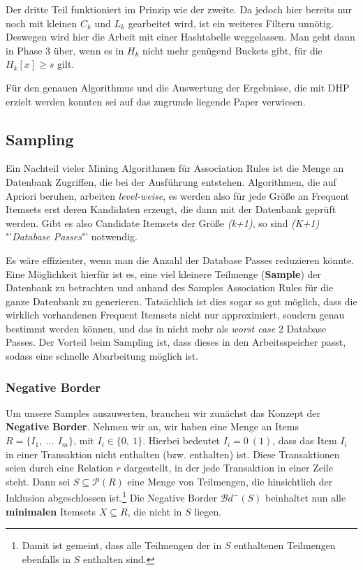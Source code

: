 Der dritte Teil funktioniert im Prinzip wie der zweite. Da jedoch hier bereits
nur noch mit kleinen \(C_k\) und \(L_k\) gearbeitet wird, ist ein weiteres Filtern
unnötig. Deswegen wird hier die Arbeit mit einer Hashtabelle weggelassen. Man geht
dann in Phase 3 über, wenn es in \(H_k\) nicht mehr genügend Buckets gibt, für die
\(H_k[x] \geq s\) gilt.

Für den genauen Algorithmus und die Auswertung der Ergebnisse, die mit DHP erzielt
werden konnten sei auf das zugrunde liegende Paper verwiesen.

\subsection{Sampling}
Ein Nachteil vieler Mining Algorithmen für Association Rules ist die Menge an
Datenbank Zugriffen, die bei der Ausführung entstehen. Algorithmen, die auf 
Apriori beruhen, arbeiten \textit{level-weise}, es werden also für jede Größe
an Frequent Itemsets erst deren Kandidaten erzeugt, die dann mit der Datenbank
geprüft werden. Gibt es also Candidate Itemsets der Größe \textit{(k+1)}, so 
sind \textit{(K+1)} "'\textit{Database Passes}"' notwendig.

Es wäre effizienter, wenn man die Anzahl der Database Passes reduzieren könnte.
Eine Möglichkeit hierfür ist es, eine viel kleinere Teilmenge (\textbf{Sample})
der Datenbank zu betrachten und anhand des Samples Association Rules für die
ganze Datenbank zu generieren. Tatsächlich ist dies sogar so gut möglich, dass
die wirklich vorhandenen Frequent Itemsets nicht nur approximiert, sondern genau
bestimmt werden können, und das in nicht mehr als \textit{worst case} 2 Database
Passes.
Der Vorteil beim Sampling ist, dass dieses in den Arbeitsspeicher passt, sodass
eine schnelle Abarbeitung möglich ist.

\subsubsection{Negative Border}
Um unsere Samples auszuwerten, brauchen wir zunächst das Konzept der \textbf{Negative
Border}. Nehmen wir an, wir haben eine Menge an Items \(R = \{I_1,\ \dots\,\ I_m\}\),
mit \(I_i \in \{0,\ 1\}\). Hierbei bedeutet \(I_i = 0\ (1)\), dass das Item \(I_i\)
in einer Transaktion nicht enthalten (bzw. enthalten) ist. Diese Transaktionen seien
durch eine Relation \(r\) dargestellt, in der jede Transaktion in einer Zeile steht.
Dann sei \(S\subseteq
\mathcal{P}(R)\) eine Menge von Teilmengen, die hinsichtlich der Inklusion 
abgeschlossen ist.\footnote{Damit ist gemeint, dass alle Teilmengen der in \(S\)
enthaltenen Teilmengen ebenfalls in \(S\) enthalten sind.}
Die Negative Border \(\mathcal{B}d^{-}(S)\) beinhaltet nun alle \textbf{minimalen} Itemsets
\(X\subseteq R\), die nicht in \(S\) liegen.

